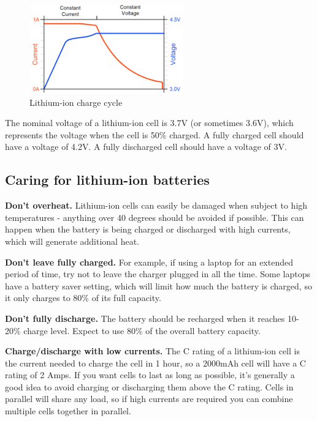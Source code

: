 \documentclass{article}
\theoremstyle{definition}
\theoremstyle{definition}
\theoremstyle{remark}
\begin{document}
    \begin{figure}[!ht]
      \centering
      \includegraphics[]{Images/image_4_1_(charge_cycle).png}
      \caption*{\centering Lithium-ion charge cycle}
    \end{figure}

    The nominal voltage of a lithium-ion cell is 3.7V (or sometimes 3.6V), which represents the voltage when the cell is 50\% charged. A fully charged cell should have a voltage of 4.2V. A fully discharged cell should have a voltage of 3V.


  \subsection{Caring for lithium-ion batteries} %
  \label{sub:caring_for_lithium_ion_batteries}

    \textbf{Don’t overheat.} Lithium-ion cells can easily be damaged when subject to high temperatures - anything over 40 degrees should be avoided if possible. This can happen when the battery is being charged or discharged with high currents, which will generate additional heat.

    \textbf{Don’t leave fully charged.} For example, if using a laptop for an extended period of time, try not to leave the charger plugged in all the time. Some laptops have a battery saver setting, which will limit how much the battery is charged, so it only charges to 80\% of its full capacity. 

    \textbf{Don’t fully discharge.} The battery should be recharged when it reaches 10-20\% charge level. Expect to use 80\% of the overall battery capacity. 

    \textbf{Charge/discharge with low currents.} The C rating of a lithium-ion cell is the current needed to charge the cell in 1 hour, so a 2000mAh cell will have a C rating of 2 Amps. If you want cells to last as long as possible, it’s generally a good idea to avoid charging or discharging them above the C rating. Cells in parallel will share any load, so if high currents are required you can combine multiple cells together in parallel.
  
\end{document}
